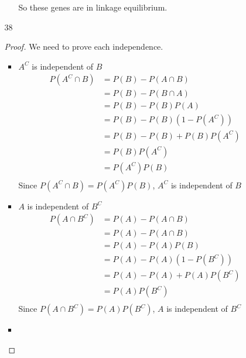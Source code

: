 \documentclass[12pt,letterpaper]{article}
\begin{document}
\begin{enumerate}
\begin{enumerate}
\begin{enumerate}[label=(\arabic*)]
              So these genes are in linkage equilibrium.
          \end{enumerate}
        \item [38]
          \begin{proof}
            We need to prove each independence.
            \begin{itemize}
              \item
                $A^C$ is independent of $B$
                \begin{align*}
                  P\left(A^C \cap B\right) &= P\left(B\right) - P\left(A \cap B\right) \\
                  &= P\left(B\right) - P\left(B \cap A\right) \\
                  &= P\left(B\right) - P\left(B\right)P\left(A\right) \\
                  &= P\left(B\right) - P\left(B\right)\left(1 - P\left(A^C\right)\right) \\
                  &= P\left(B\right) - P\left(B\right) + P\left(B\right)P\left(A^C\right) \\
                  &= P\left(B\right)P\left(A^C\right) \\
                  &= P\left(A^C\right)P\left(B\right) \\
                \end{align*}
                Since $P\left(A^C \cap B\right) = P\left(A^C\right)P\left(B\right)$, $A^C$ is independent of $B$
              \item
                $A$ is independent of $B^C$
                \begin{align*}
                  P\left(A \cap B^C\right) &= P\left(A\right) - P\left(A \cap B\right) \\
                  &= P\left(A\right) - P\left(A \cap B\right) \\
                  &= P\left(A\right) - P\left(A\right)P\left(B\right) \\
                  &= P\left(A\right) - P\left(A\right)\left(1 - P\left(B^C\right)\right) \\
                  &= P\left(A\right) - P\left(A\right) + P\left(A\right)P\left(B^C\right) \\
                  &= P\left(A\right)P\left(B^C\right) \\
                \end{align*}
                Since $P\left(A \cap B^C\right) = P\left(A\right)P\left(B^C\right)$, $A$ is independent of $B^C$
              \item

\end{itemize}
\end{proof}
\end{enumerate}
\end{enumerate}
\end{document}
